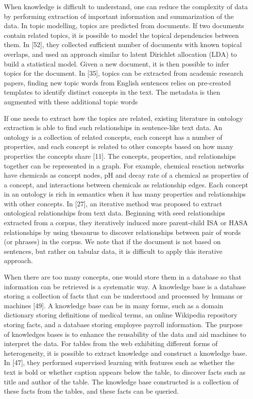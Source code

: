 When knowledge is difficult to understand, one can reduce the complexity of data by performing extraction of important information and summarization of the data. In topic modelling, topics are predicted from documents. If two documents contain related topics, it is possible to model the topical dependencies between them. In \cite{Zolaktaf2012Modeling}[52], they collected sufficient number of documents with known topical overlaps, and used an approach similar to latent Dirichlet allocation (LDA) to build a statistical model. Given a new document, it is then possible to infer topics for the document. In \cite{Nargesian2018Table}[35], topics can be extracted from academic research papers, finding new topic words from English sentences relies on pre-created templates to identify distinct concepts in the text. The metadata is then augmented with these additional topic words

If one needs to extract how the topics are related, existing literature in ontology extraction is able to find such relationships in sentence-like text data. An ontology is a collection of related concepts, each concept has a number of properties, and each concept is related to other concepts based on how many properties the concepts share \cite{cruz2005role}[11]. The concepts, properties, and relationships together can be represented in a graph. For example, chemical reaction networks have chemicals as concept nodes, pH and decay rate of a chemical as properties of a concept, and interactions between chemicals as relationship edges. Each concept in an ontology is rich in semantics when it has many properties and relationships with other concepts. In \cite{10.1145/2396761.2398468}[27], an iterative method was proposed to extract ontological relationships from text data. Beginning with seed relationships extracted from a corpus, they iteratively induced more parent-child ISA or HASA relationships by using thesaurus to discover relationships between pair of words (or phrases) in the corpus. We note that if the document is not based on sentences, but rather on tabular data, it is difficult to apply this iterative approach.

When there are too many concepts, one would store them in a database so that information can be retrieved is a systematic way. A knowledge base is a database storing a collection of facts that can be understood and processed by humans or machines \cite{Zhang2018Managing}[49]. A knowledge base can be in many forms, such as a domain dictionary storing definitions of medical terms, an online Wikipedia repository storing facts, and a database storing employee payroll information. The purpose of knowledges bases is to enhance the reusability of the data and aid machines to interpret the data. For tables from the web exhibiting different forms of heterogeneity, it is possible to extract knowledge and construct a knowledge base. In \cite{10.1145/3183713.3183729}[47], they performed supervised learning with features such as whether the text is bold or whether caption appears below the table, to discover facts such as title and author of the table. The knowledge base constructed is a collection of these facts from the tables, and these facts can be queried.

